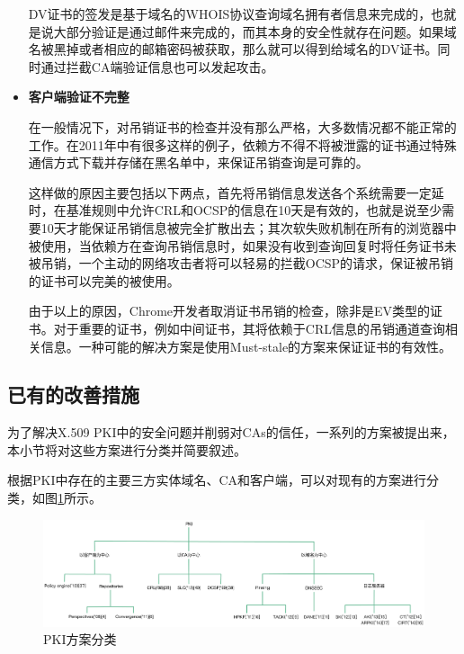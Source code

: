 \begin{itemize}
	DV证书的签发是基于域名的WHOIS协议查询域名拥有者信息来完成的，也就是说大部分验证是通过邮件来完成的，而其本身的安全性就存在问题。如果域名被黑掉或者相应的邮箱密码被获取，那么就可以得到给域名的DV证书。同时通过拦截CA端验证信息也可以发起攻击。



	\item 

	\noindent\textbf{客户端验证不完整}

	在一般情况下，对吊销证书的检查并没有那么严格，大多数情况都不能正常的工作。在2011年中有很多这样的例子，依赖方不得不将被泄露的证书通过特殊通信方式下载并存储在黑名单中，来保证吊销查询是可靠的。

	这样做的原因主要包括以下两点，首先将吊销信息发送各个系统需要一定延时，在基准规则中允许CRL和OCSP的信息在10天是有效的，也就是说至少需要10天才能保证吊销信息被完全扩散出去；其次软失败机制在所有的浏览器中被使用，当依赖方在查询吊销信息时，如果没有收到查询回复时将任务证书未被吊销，一个主动的网络攻击者将可以轻易的拦截OCSP的请求，保证被吊销的证书可以完美的被使用。

	由于以上的原因，Chrome开发者取消证书吊销的检查，除非是EV类型的证书。对于重要的证书，例如中间证书，其将依赖于CRL信息的吊销通道查询相关信息。一种可能的解决方案是使用Must-stale的方案来保证证书的有效性。

\end{itemize}


\subsection{已有的改善措施}

为了解决X.509 PKI中的安全问题并削弱对CAs的信任，一系列的方案被提出来，本小节将对这些方案进行分类并简要叙述。



根据PKI中存在的主要三方实体域名、CA和客户端，可以对现有的方案进行分类，如图\ref{fig:Classification_of_PKI_proposals}所示。

\begin{figure}[htbp]
 	\centering
 	\includegraphics[width = 1.0\textwidth]{img/Classification_of_PKI_proposals}
 	\caption{PKI方案分类}\label{fig:Classification_of_PKI_proposals}
\end{figure}



